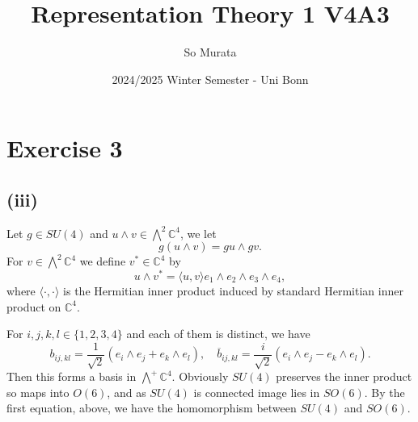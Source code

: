 \documentclass{article}
\title{Representation Theory 1 V4A3}
\author{So Murata}
\date{2024/2025 Winter Semester - Uni Bonn}
\numberwithin{equation}{section}
\begin{document}
\maketitle

\section*{Exercise 3}

\subsection*{(iii)}

Let $g\in SU(4)$ and $u\wedge v\in\bigwedge^2\mathbb{C}^4$, we let
\begin{equation*}
g(u\wedge v) = gu\wedge gv.
\end{equation*}
For $v\in\bigwedge^2\mathbb{C}^4$ we define $v^*\in\mathbb{C}^4$ by 
\begin{equation*}
u\wedge v^* = \langle u,v\rangle e_1\wedge e_2\wedge e_3\wedge e_4,
\end{equation*}
where $\langle\cdot,\cdot\rangle$ is the Hermitian inner product induced by standard Hermitian inner product on $\mathbb{C}^4$.

For $i,j,k,l\in\{1,2,3,4\}$ and each of them is distinct, we have
\begin{equation*}
b_{ij,kl} = {\frac 1 {\sqrt{2}}}(e_i\wedge e_j+e_k\wedge e_l),\quad \overline{b}_{ij,kl} = {\frac i {\sqrt{2}}}(e_i\wedge e_j- e_k\wedge e_l).
\end{equation*}
Then this forms a basis in $\bigwedge^+\mathbb{C}^4$. Obviously $SU(4)$ preserves the inner product so maps into $O(6)$, and as $SU(4)$ is connected image lies in $SO(6)$. By the first equation, above, we have the homomorphism between $SU(4)$ and $SO(6)$. 
\end{document}
